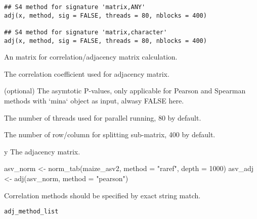 \documentclass[a4paper]{book}
\begin{document}
%
\begin{Usage}
\begin{verbatim}
## S4 method for signature 'matrix,ANY'
adj(x, method, sig = FALSE, threads = 80, nblocks = 400)

## S4 method for signature 'matrix,character'
adj(x, method, sig = FALSE, threads = 80, nblocks = 400)
\end{verbatim}
\end{Usage}
%
\begin{Arguments}
\begin{ldescription}
\item[\code{x}] An matrix for correlation/adjacency matrix calculation.

\item[\code{method}] The correlation coefficient used for adjacency matrix.

\item[\code{sig}] (optional) The asymtotic P-values, only applicable for Pearson
and Spearman methods with `mina` object as input, alwasy FALSE here.

\item[\code{threads}] The number of threads used for parallel running, 80 by
default.

\item[\code{nblocks}] The number of row/column for splitting sub-matrix, 400 by
default.
\end{ldescription}
\end{Arguments}
%
\begin{Value}
y The adjacency matrix.
\end{Value}
%
\begin{Examples}
\begin{ExampleCode}
asv_norm <- norm_tab(maize_asv2, method = "raref", depth = 1000)
asv_adj <- adj(asv_norm, method = "pearson")
\end{ExampleCode}
\end{Examples}
%
\begin{Description}\relax
Correlation methods should be specified by exact string match.
\end{Description}
%
\begin{Usage}
\begin{verbatim}
adj_method_list
\end{verbatim}
\end{Usage}
\end{document}
